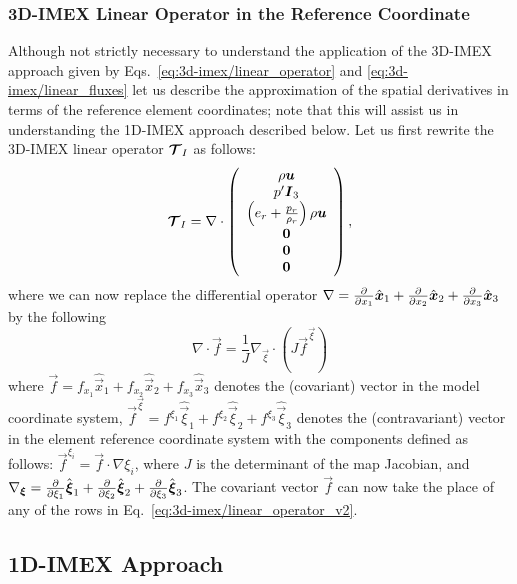 \documentclass{report}
\begin{document}
{\subsubsection{3D-IMEX Linear Operator in the Reference Coordinate}
 Although not strictly necessary to understand the application of the 3D-IMEX approach given by Eqs.\ \eqref{eq:3d-imex/linear_operator} and \eqref{eq:3d-imex/linear_fluxes} let us describe the approximation of the spatial derivatives in terms of the reference element coordinates; note that this will assist us in understanding the 1D-IMEX approach described below. Let us first rewrite the 3D-IMEX linear operator 
 $\boldsymbol{{\mathcal{T}}}_{I}$ as follows:
 \begin{equation}
 \boldsymbol{{\mathcal{T}}}_{I}= \nabla \cdot \left( \begin{array}{c}
 \rho \boldsymbol{{u}} \\
 p' \boldsymbol{{I}}_3 \\
 \left( e_r + \frac{p_r}{\rho_r} \right) \rho \boldsymbol{{u}} \\
\boldsymbol{{0}}\\
\boldsymbol{{0}} \\
\boldsymbol{{0}}
\end{array}
\right), 
\label{eq:3d-imex/linear_operator_v2}
\end{equation}
 where we can now replace the differential operator $\nabla=\frac{\partial }{\partial x_1} \hat{\boldsymbol{{x}}}_1 + \frac{\partial }{\partial x_2} \hat{\boldsymbol{{x}}}_2 + \frac{\partial }{\partial x_3} \hat{\boldsymbol{{x}}}_3$
 by the following
 \[
 \nabla \cdot \vec{f} = \frac{1}{J} \nabla_{\vec{\xi}} \cdot \left(J \vec{f}^{\vec{\xi}} \right)
 \]
 where $\vec{f}=f_{x_1} \hat{\vec{x}}_1 + f_{x_2} \hat{\vec{x}}_2 + f_{x_3} \hat{\vec{x}}_3$ denotes the (covariant) vector in the model coordinate system, 
 $\vec{f}^{\vec{\xi}}=f^{\xi_1} \hat{\vec{\xi}}_1 + f^{\xi_2} \hat{\vec{\xi}}_2 + f^{\xi_3} \hat{\vec{\xi}}_3$ denotes the (contravariant) vector in the element reference coordinate system with the components defined as follows:
 $\vec{f}^{\xi_i}=\vec{f} \cdot \nabla \xi_i$, where $J$ is the determinant of the map Jacobian, and 
 $\nabla_{\boldsymbol{{\xi}}}=\frac{\partial }{\partial \xi_1} \hat{\boldsymbol{{\xi}}}_1 + \frac{\partial }{\partial \xi_2} \hat{\boldsymbol{{\xi}}}_2 + \frac{\partial }{\partial \xi_3} \hat{\boldsymbol{{\xi}}}_3$. The covariant vector $\vec{f}$ can now take the place of any of the rows in Eq.\ \eqref{eq:3d-imex/linear_operator_v2}.
 
\subsection{1D-IMEX Approach}
\label{sec:1D-IMEX}

}
\end{document}
